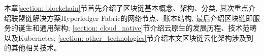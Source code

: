 本章\ref{section: blockchain}节首先介绍了区块链基本概念、架构、分类, 其次重点介绍联盟链解决方案Hyperledger Fabric的网络节点、账本结构, 最后介绍区块链即服务的诞生和通用架构; \ref{section: cloud_native}节介绍云原生的发展历程、技术范畴以及Kubernetes; \ref{section: other_technologies}节介绍本文区块链云化架构涉及到的其他相关技术。






